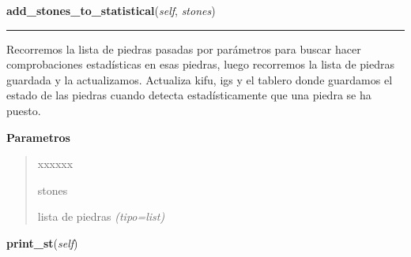    \label{src:goban:Goban:add_stones_to_statistical}

    \vspace{0.5ex}

\hspace{.8\funcindent}\begin{boxedminipage}{\funcwidth}

    \raggedright \textbf{add\_stones\_to\_statistical}(\textit{self}, \textit{stones})

    \vspace{-1.5ex}

    \rule{\textwidth}{0.5\fboxrule}
\setlength{\parskip}{2ex}
Recorremos la lista de piedras pasadas por parámetros para buscar hacer comprobaciones estadísticas en esas piedras, luego recorremos la lista de piedras guardada y la actualizamos. Actualiza kifu, igs y el tablero donde guardamos el estado de las piedras cuando detecta estadísticamente que una piedra se ha puesto.

\setlength{\parskip}{1ex}
      \textbf{Parametros}
      \vspace{-1ex}

      \begin{quote}
        \begin{Ventry}{xxxxxx}

          \item[stones]


lista de piedras
            {\it (tipo=list)}

        \end{Ventry}

      \end{quote}

    \end{boxedminipage}

    \label{src:goban:Goban:print_st}

    \vspace{0.5ex}

\hspace{.8\funcindent}\begin{boxedminipage}{\funcwidth}

    \raggedright \textbf{print\_st}(\textit{self})

\setlength{\parskip}{2ex}
\setlength{\parskip}{1ex}
    \end{boxedminipage}

